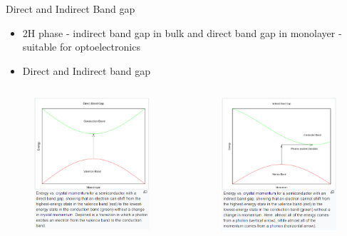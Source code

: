 \documentclass{beamer}
\begin{document}
\begin{frame}{Direct and Indirect Band gap}
\begin{itemize}
    \item 2H phase - indirect band gap in bulk and direct band gap in monolayer - suitable for optoelectronics
    \item Direct and Indirect band gap
\end{itemize}
\begin{columns}
    \begin{figure}
        \centering
        \includegraphics[scale=0.5]{direct.PNG}
    \end{figure}
    \begin{figure}
        \centering
        \includegraphics[scale=0.5]{indirect.PNG}

\end{figure}
\end{columns}
\end{frame}
\end{document}
